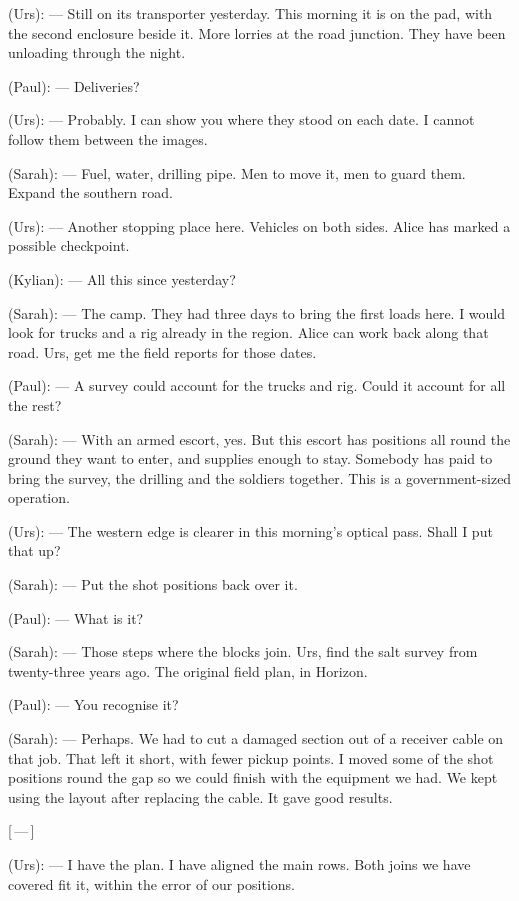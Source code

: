 \begin{room}
(Urs): --- Still on its transporter yesterday. This morning it is on the pad, with the second enclosure beside it. More lorries at the road junction. They have been unloading through the night.

(Paul): --- Deliveries?

(Urs): --- Probably. I can show you where they stood on each date. I cannot follow them between the images.

(Sarah): --- Fuel, water, drilling pipe. Men to move it, men to guard them. Expand the southern road.

(Urs): --- Another stopping place here. Vehicles on both sides. Alice has marked a possible checkpoint.

(Kylian): --- All this since yesterday?

(Sarah): --- The camp. They had three days to bring the first loads here. I would look for trucks and a rig already in the region. Alice can work back along that road. Urs, get me the field reports for those dates.

(Paul): --- A survey could account for the trucks and rig. Could it account for all the rest?

(Sarah): --- With an armed escort, yes. But this escort has positions all round the ground they want to enter, and supplies enough to stay. Somebody has paid to bring the survey, the drilling and the soldiers together. This is a government-sized operation.

(Urs): --- The western edge is clearer in this morning's optical pass. Shall I put that up?

(Sarah): --- Put the shot positions back over it.

(Paul): --- What is it?

(Sarah): --- Those steps where the blocks join. Urs, find the salt survey from twenty-three years ago. The original field plan, in Horizon.

(Paul): --- You recognise it?

(Sarah): --- Perhaps. We had to cut a damaged section out of a receiver cable on that job. That left it short, with fewer pickup points. I moved some of the shot positions round the gap so we could finish with the equipment we had. We kept using the layout after replacing the cable. It gave good results.

\centerline{[\,---\,]}

(Urs): --- I have the plan. I have aligned the main rows. Both joins we have covered fit it, within the error of our positions.


\end{room}
